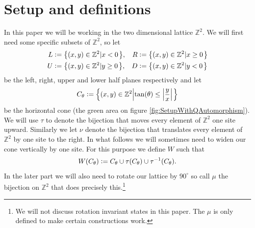 \documentclass[12pt,a4paper,twoside]{article}
\newcommand{\defeq}{\vcentcolon=}
\let\originalleft\left
\let\originalright\right
\renewcommand{\left}{\mathopen{}\mathclose\bgroup\originalleft}
\renewcommand{\right}{\aftergroup\egroup\originalright}
\newcommand{\ZZ}{\mathbb Z}
\theoremstyle{definition}
\numberwithin{equation}{section}
\begin{document}
\section{Setup and definitions}\label{sec:Setup}
In this paper we will be working in the two dimensional lattice $\ZZ^2$. We will first need some specific subsets of $\ZZ^2$, so let
\begin{align}
	L&\defeq \left\{(x,y)\in\ZZ^2\left|x<0\right.\right\},&R&\defeq \left\{(x,y)\in\ZZ^2\left|x\geq 0\right.\right\}\\
	U&\defeq \left\{(x,y)\in\ZZ^2\left|y\geq 0\right.\right\},&D&\defeq \left\{(x,y)\in\ZZ^2\left|y<0\right.\right\}
\end{align}
be the left, right, upper and lower half planes respectively and let
\begin{equation}
	C_\theta\defeq \left\{(x,y)\in\ZZ^2\left|\tan(\theta)\leq\abs{\frac{y}{x}}\right.\right\}
\end{equation}
be the horizontal cone (the green area on figure \ref{fig:SetupWithQAutomorphism}). We will use $\tau$ to denote the bijection that moves every element of $\ZZ^2$ one site upward. Similarly we let $\nu$ denote the bijection that translates every element of $\ZZ^2$ by one site to the right. In what follows we will sometimes need to widen our cone vertically by one site. For this purpose we define $W$ such that
\begin{equation}
	W(C_\theta)\defeq C_\theta\cup\tau(C_\theta)\cup\tau^{-1}(C_\theta).
\end{equation}
In the later part we will also need to rotate our lattice by $90^\circ$ so call $\mu$ the bijection on $\ZZ^2$ that does precisely this.\footnote{We will not discuss rotation invariant states in this paper. The $\mu$ is only defined to make certain constructions work.}
\end{document}
